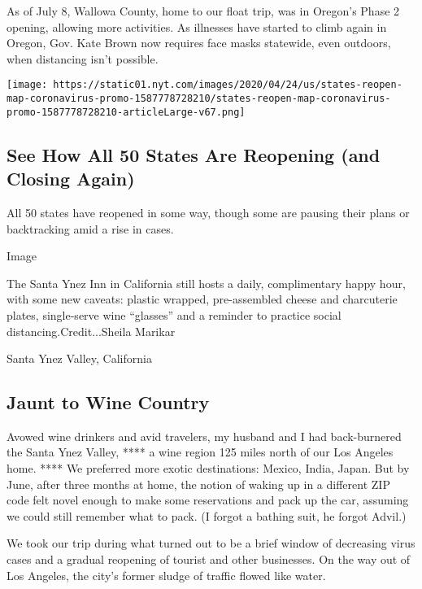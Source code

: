 As of July 8, Wallowa County, home to our float trip, was in Oregon's
Phase 2 opening, allowing more activities. As illnesses have started to
climb again in Oregon, Gov. Kate Brown now requires face masks
statewide, even outdoors, when distancing isn't possible.

\href{https://www.nytimes.com/interactive/2020/us/states-reopen-map-coronavirus.html}{}

\texttt{[image: https://static01.nyt.com/images/2020/04/24/us/states-reopen-map-coronavirus-promo-1587778728210/states-reopen-map-coronavirus-promo-1587778728210-articleLarge-v67.png]}

\hypertarget{see-how-all-50-states-are-reopening-and-closing-again}{%
\subsection{See How All 50 States Are Reopening (and Closing
Again)}\label{see-how-all-50-states-are-reopening-and-closing-again}}

All 50 states have reopened in some way, though some are pausing their
plans or backtracking amid a rise in cases.

Image

The Santa Ynez Inn in California still hosts a daily, complimentary
happy hour, with some new caveats: plastic wrapped, pre-assembled cheese
and charcuterie plates, single-serve wine ``glasses'' and a reminder to
practice social distancing.Credit...Sheila Marikar

Santa Ynez Valley, California

\hypertarget{jaunt-to-wine-country}{%
\subsection{Jaunt to Wine Country}\label{jaunt-to-wine-country}}

Avowed wine drinkers and avid travelers, my husband and I had
back-burnered the Santa Ynez Valley, **** a wine region 125 miles north
of our Los Angeles home. **** We preferred more exotic destinations:
Mexico, India, Japan. But by June, after three months at home, the
notion of waking up in a different ZIP code felt novel enough to make
some reservations and pack up the car, assuming we could still remember
what to pack. (I forgot a bathing suit, he forgot Advil.)

We took our trip during what turned out to be a brief window of
decreasing virus cases and a gradual reopening of tourist and other
businesses. On the way out of Los Angeles, the city's former sludge of
traffic flowed like water.

